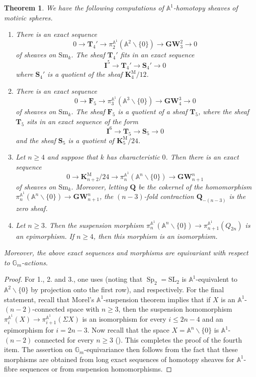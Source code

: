 \documentclass[11pt,leqno]{amsart}
\newcommand{\GW}{\mathbf{GW}}
\renewcommand{\1}{{\rm 1\hspace*{-0.4ex}%
\rule{0.1ex}{1.52ex}\hspace*{0.2ex}}}
\newcommand{\gm}[1]{{{\mathbb G}_{m}^{#1}}}
\newcommand{\Gm}{{\gm{}}}
\newcommand{\Sm}{\mathrm{Sm}}
\newcommand{\<}[1]{{\langle}#1 {\rangle}}
\newcommand{\Ibf}{\mathbf{I}}
\newcommand{\Kbf}{\mathbf{K}}
\newcommand{\Abb}{\mathbb{A}}
\newcommand{\Mr}{\mathrm{M}}
\newcommand{\Qbf}{\mathbf{Q}}
\newcommand{\Tbf}{\mathbf{T}}
\newcommand{\Sbf}{\mathbf{S}}
\newcommand{\Fbf}{\mathbf{F}}
\theoremstyle{plain}
\newtheorem{thm}{Theorem}[section]
\theoremstyle{definition}
\theoremstyle{remark}
\numberwithin{equation}{section}
\begin{document}
\begin{thm}\label{thm:homotopy_sheaves_of_motivic_spheres}
We have the following computations of $\Abb^1$-homotopy sheaves of motivic spheres.
\begin{enumerate}
    \item There is an exact sequence \[0\to\Tbf_4'\to\pi_2^{\Abb^1}(\Abb^2\smallsetminus \{0\})\to\GW_3^2\to 0\] of sheaves on $\Sm_k$. The sheaf $\Tbf_4'$ fits in an exact sequence \[\Ibf^5\to\Tbf_4'\to\Sbf_4'\to 0\] where $\Sbf_4'$ is a quotient of the sheaf $\Kbf_4^\Mr/12$.
    \item There is an exact sequence \[0\to\Fbf_5\rightarrow\pi_3^{\Abb^1}(\Abb^3\smallsetminus \{0\})\to\GW_4^3\to 0\] of sheaves on $\Sm_k$. The sheaf $\Fbf_5$ is a quotient of a sheaf $\Tbf_5$, where the sheaf $\Tbf_5$ sits in an exact sequence of the form \[\Ibf^6\rightarrow\Tbf_5\rightarrow\Sbf_5\rightarrow 0\] and the sheaf $\Sbf_5$ is a quotient of $\Kbf_5^\Mr/24$.
    \item Let $n\geq 4$ and suppose that $k$ has characteristic $0$. Then there is an exact sequence \[0\rightarrow\Kbf_{n+2}^\Mr/24\rightarrow\pi_n^{\Abb^1}(\Abb^n\smallsetminus \{0\})\rightarrow\GW_{n+1}^n\] of sheaves on $\Sm_k$. Moreover, letting $\Qbf$ be the cokernel of the homomorphism $\pi_n^{\Abb^1}(\Abb^n\smallsetminus \{0\})\rightarrow\GW_{n+1}^n$, the $(n-3)$-fold contraction $\Qbf_{-(n-3)}$ is the zero sheaf.
    \item Let $n\geq 3$. Then the suspension morphism $\pi_n^{\Abb^1}(\Abb^n\smallsetminus\{0\})\rightarrow\pi_{n+1}^{\Abb^1}(Q_{2n})$ is an epimorphism. If $n\geq 4$, then this morphism is an isomorphism.
\end{enumerate}
Moreover, the above exact sequences and morphisms are equivariant with respect to $\Gm$-actions.
\end{thm}

\begin{proof}
For 1., 2. and 3., one uses \cite[Theorem 3.3]{asokCohomologicalClassificationVector2014} (noting that $\operatorname{Sp}_2=\mathrm{SL}_2$ is $\Abb^1$-equivalent to $\Abb^2\smallsetminus \{0\}$ by projection onto the first row), \cite[Theorem 4.4.1]{asokSplittingVectorBundles2014} and \cite[Theorem 7.2.1]{asokP1stabilizationUnstableMotivic} respectively. For the final statement, recall that Morel's $\Abb^1$-suspension theorem \cite[Theorem 6.61]{morelA1AlgebraicTopologyField2012} implies
that if $X$ is an $\Abb^1$-$(n-2)$-connected space with $n\geq 3$, then the suspension homomorphism $\pi_i^{\Abb^1}(X)\rightarrow\pi_{i+1}^{\Abb^1}(\Sigma X)$ is an isomorphism for every $i\leq 2n-4$ and an epimorphism for $i=2n-3$. Now recall that the space $X=\Abb^n\smallsetminus \{0\}$ is $\Abb^1$-$(n-2)$ connected for every $n\geq 3$ (\cite[Theorem 6.38]{morelA1AlgebraicTopologyField2012}). This completes the proof of the fourth item. The assertion on $\Gm$-equivariance then follows from the fact that these morphisms are obtained from long exact sequences of homotopy sheaves for $\Abb^1$-fibre sequences or from suspension homomorphisms.
\end{proof}
\end{document}
